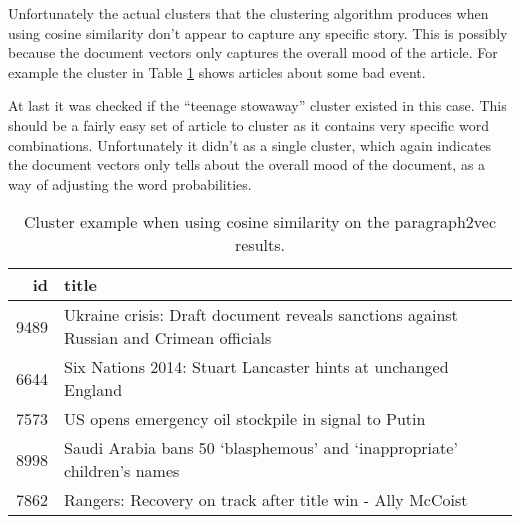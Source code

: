 Unfortunately the actual clusters that the clustering algorithm produces when using cosine similarity don't appear to capture any specific story. This is possibly because the document vectors only captures the overall mood of the article. For example the cluster in Table \ref{table:paragraph2vec:example} shows articles about some bad event.

At last it was checked if the ``teenage stowaway'' cluster existed in this case. This should be a fairly easy set of article to cluster as it contains very specific word combinations. Unfortunately it didn't as a single cluster, which again indicates the document vectors only tells about the overall mood of the document, as a way of adjusting the word probabilities.

\begin{table}[H]
\centering
\begin{tabular}{r|p{10cm}}
id & title \\ \hline
  9489 & Ukraine crisis: Draft document reveals sanctions against Russian and Crimean officials \\
  6644 & Six Nations 2014: Stuart Lancaster hints at unchanged England \\
  7573 & US opens emergency oil stockpile in signal to Putin \\
  8998 & Saudi Arabia bans 50 ‘blasphemous’ and ‘inappropriate’ children’s names \\
  7862 & Rangers: Recovery on track after title win - Ally McCoist
\end{tabular}
\caption{Cluster example when using cosine similarity on the paragraph2vec results.}
\label{table:paragraph2vec:example}
\end{table}
